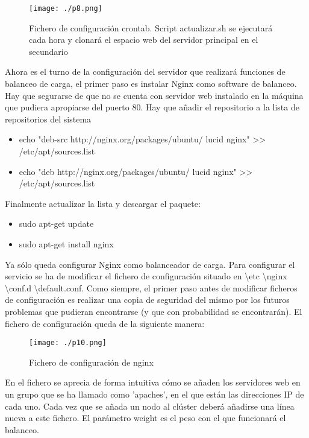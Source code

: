 \documentclass[paper=a4, fontsize=12pt]{scrartcl} %
\begin{document}
\begin{figure}[H] %
	\centering
	\label{lsblk}
	\texttt{[image: ./p8.png]}
	\caption{Fichero de configuración crontab. Script actualizar.sh se ejecutará cada hora y clonará el espacio web del servidor principal en el secundario} 
\end{figure}

Ahora es el turno de la configuración del servidor que realizará funciones de balanceo de carga, el primer paso es instalar Nginx como software de balanceo. Hay que segurarse de que no se cuenta con servidor web instalado en la máquina que pudiera apropiarse del puerto 80.
Hay que añadir el repositorio a la lista de repositorios del sistema
\begin{itemize}
	\item echo "deb-src http://nginx.org/packages/ubuntu/ lucid nginx" >> /etc/apt/sources.list
	\item echo "deb http://nginx.org/packages/ubuntu/ lucid nginx" >> /etc/apt/sources.list

\end{itemize}

Finalmente actualizar la lista y descargar el paquete:

\begin{itemize}
	\item sudo apt-get update
	\item sudo apt-get install nginx
\end{itemize}

Ya sólo queda configurar Nginx como balanceador de carga. Para configurar el servicio se ha de modificar el fichero de configuración situado en \textbackslash etc \textbackslash nginx \textbackslash conf.d \textbackslash default.conf. Como siempre, el primer paso antes de modificar ficheros de configuración es realizar una copia de seguridad del mismo por los futuros problemas que pudieran encontrarse (y que con probabilidad se encontrarán).
El fichero de configuración queda de la siguiente manera:
\begin{figure}[H] %
	\centering
	\label{lsblk}
	\texttt{[image: ./p10.png]}
	\caption{Fichero de configuración de nginx} 
\end{figure}
En el fichero se aprecia de forma intuitiva cómo se añaden los servidores web en un grupo que se ha llamado como 'apaches', en el que están las direcciones IP de cada uno. Cada vez que se añada un nodo al clúster deberá añadirse una línea nueva a este fichero. El parámetro weight es el peso con el que funcionará el balanceo.
\end{document}
